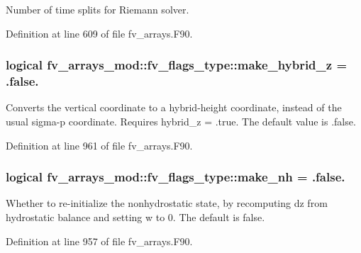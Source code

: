 Number of time splits for Riemann solver. 



Definition at line 609 of file fv\-\_\-arrays.\-F90.

\subsubsection[{make\-\_\-hybrid\-\_\-z}]{\setlength{\rightskip}{0pt plus 5cm}logical fv\-\_\-arrays\-\_\-mod\-::fv\-\_\-flags\-\_\-type\-::make\-\_\-hybrid\-\_\-z = .false.}\label{structfv__arrays__mod_1_1fv__flags__type_a954890d920a3c7ec31803a505c4d93d0}


Converts the vertical coordinate to a hybrid-\/height coordinate, instead of the usual sigma-\/p coordinate. Requires hybrid\-\_\-z = .true. The default value is .false. 



Definition at line 961 of file fv\-\_\-arrays.\-F90.

\subsubsection[{make\-\_\-nh}]{\setlength{\rightskip}{0pt plus 5cm}logical fv\-\_\-arrays\-\_\-mod\-::fv\-\_\-flags\-\_\-type\-::make\-\_\-nh = .false.}\label{structfv__arrays__mod_1_1fv__flags__type_af9e0c974a9870aa7032b2a9b96b42793}


Whether to re-\/initialize the nonhydrostatic state, by recomputing dz from hydrostatic balance and setting w to 0. The default is false. 



Definition at line 957 of file fv\-\_\-arrays.\-F90.

